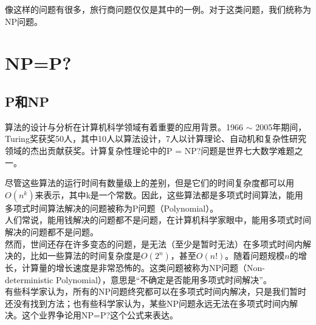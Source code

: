 像这样的问题有很多，旅行商问题仅仅是其中的一例。对于这类问题，我们统称为NP问题。

\newpage

\section{NP=P?}

\subsection{P和NP}

算法的设计与分析在计算机科学领域有着重要的应用背景。1966 $ \sim $ 2005年期间，Turing奖获奖50人，其中10人以算法设计，7人以计算理论、自动机和复杂性研究领域的杰出贡献获奖。计算复杂性理论中的P = NP?问题是世界七大数学难题之一。

\begin{table}[H]
	\centering
	\caption{常见算法时间复杂度}
\end{table}

尽管这些算法的运行时间有数量级上的差别，但是它们的时间复杂度都可以用$ O(n^k) $来表示，其中k是一个常数。因此，这些算法都是多项式时间算法，能用多项式时间算法解决的问题被称为P问题（Polynomial）。\\

人们常说，能用钱解决的问题都不是问题，在计算机科学家眼中，能用多项式时间解决的问题都不是问题。\\

然而，世间还存在许多变态的问题，是无法（至少是暂时无法）在多项式时间内解决的，比如一些算法的时间复杂度是$ O(2^n) $，甚至$ O(n!) $。随着问题规模$ n $的增长，计算量的增长速度是非常恐怖的。这类问题被称为NP问题（Non-deterministic Polynomial），意思是“不确定是否能用多项式时间解决”。\\

有些科学家认为，所有的NP问题终究都可以在多项式时间内解决，只是我们暂时还没有找到方法；也有些科学家认为，某些NP问题永远无法在多项式时间内解决。这个业界争论用NP=P?这个公式来表达。

